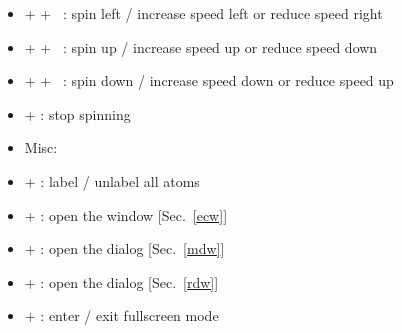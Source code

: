 {\begin{itemize}
\begin{itemize}
\item[] \Ctrl + \Shift + \RArrow\ : spin left / increase speed left or reduce speed right
\item[] \Ctrl + \Shift + \UArrow\ : spin up / increase speed up or reduce speed down
\item[] \Ctrl + \Shift + \DArrow\ : spin down / increase speed down or reduce speed up
\item[] \Ctrl +  : stop spinning \\
\item Misc:
\item[] \Ctrl +  : label / unlabel all atoms 
\item[] \Ctrl +  : open the  window [Sec.~\ref{ecw}]
\item[] \Ctrl +  : open the  dialog [Sec.~\ref{mdw}]
\item[] \Ctrl +  : open the  dialog [Sec.~\ref{rdw}]
\item[] \Ctrl +  : enter / exit fullscreen mode 
\end{itemize}
\end{itemize}}

